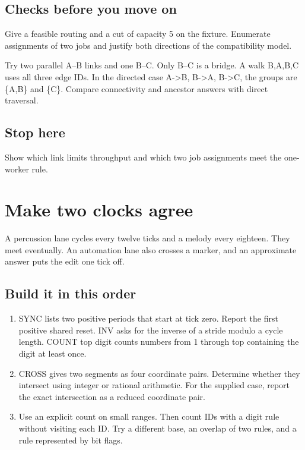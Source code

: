 \documentclass[11pt,letterpaper]{article}
\begin{document}
\subsection*{Checks before you move on}

Give a feasible routing and a cut of capacity 5 on the fixture. Enumerate assignments of two jobs and justify both directions of the compatibility model.

Try two parallel A--B links and one B--C. Only B--C is a bridge. A walk B,A,B,C uses all three edge IDs. In the directed case A->B, B->A, B->C, the groups are \{A,B\} and \{C\}. Compare connectivity and ancestor answers with direct traversal.

\subsection*{Stop here}

Show which link limits throughput and which two job assignments meet the one-worker rule.

\clearpage

\section{Make two clocks agree}\label{groovebox:09}

A percussion lane cycles every twelve ticks and a melody every eighteen. They meet eventually. An automation lane also crosses a marker, and an approximate answer puts the edit one tick off.

\subsection*{Build it in this order}

\begin{enumerate}
\item SYNC lists two positive periods that start at tick zero. Report the first positive shared reset. INV asks for the inverse of a stride modulo a cycle length. COUNT top digit counts numbers from 1 through top containing the digit at least once.
\item CROSS gives two segments as four coordinate pairs. Determine whether they intersect using integer or rational arithmetic. For the supplied case, report the exact intersection as a reduced coordinate pair.
\item Use an explicit count on small ranges. Then count IDs with a digit rule without visiting each ID. Try a different base, an overlap of two rules, and a rule represented by bit flags.
\end{enumerate}
\end{document}
